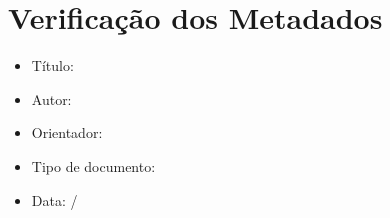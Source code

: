 \documentclass[mestrado,12pt]{UnB-PPGT}
\begin{document}
\capa

\newpage
\section*{Verificação dos Metadados}
\begin{itemize}
\item Título: \@maintitle
\item Autor: \@author
\item Orientador: \@nomeorientador
\item Tipo de documento: \@graudocumento
\item Data: \@nomemes/\@ano
\end{itemize}
\end{document}

